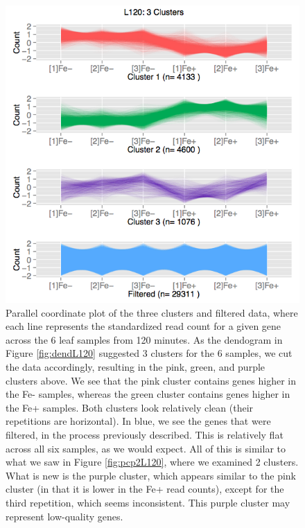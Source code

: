 \documentclass[11pt,a4paper,oldfontcommands,openany]{memoir}
\numberwithin{equation}{section} %
\begin{document}
\begin{figure}[H]
  \begin{framed}
  \centering
  \includegraphics[width=\textwidth]{pcp3L120}
  \end{framed}
  \caption{Parallel coordinate plot of the three clusters and filtered data, where each line represents the standardized read count for a given gene across the 6 leaf samples from 120 minutes. As the dendogram in Figure \ref{fig:dendL120} suggested 3 clusters for the 6 samples, we cut the data accordingly, resulting in the pink, green, and purple clusters above. We see that the pink cluster contains genes higher in the Fe- samples, whereas the green cluster contains genes higher in the Fe+ samples. Both clusters look relatively clean (their repetitions are horizontal). In blue, we see the genes that were filtered, in the process previously described. This is relatively flat across all six samples, as we would expect. All of this is similar to what we saw in Figure \ref{fig:pcp2L120}, where we examined 2 clusters. What is new is the purple cluster, which appears similar to the pink cluster (in that it is lower in the Fe+ read counts), except for the third repetition, which seems inconsistent. This purple cluster may represent low-quality genes.}
  \label{fig:pcp3L120}
\end{figure}
\end{document}
